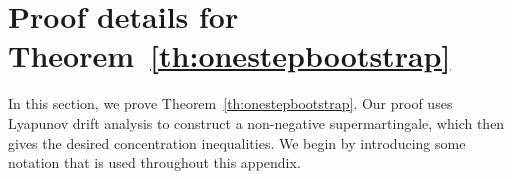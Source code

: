 \documentclass{article}
\newcommand{\R}{\mathbb{R}}
\newtheorem{lemma}[theorem]{Lemma}
\begin{document}

\section{Proof details for Theorem~\ref{th:onestepbootstrap}}\label{app:proofdetails_onestepbootstrap}
In this section, we prove Theorem~\ref{th:onestepbootstrap}. Our proof uses Lyapunov drift analysis to construct a non-negative supermartingale, which then gives the desired concentration inequalities. We begin by introducing some notation that is used throughout this appendix.
\end{document}

